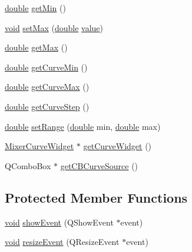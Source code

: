 \begin{DoxyCompactItemize}
\item 
\hyperlink{_super_l_u_support_8h_a8956b2b9f49bf918deed98379d159ca7}{double} \hyperlink{group___config_plugin_ga6d107a62e8f6d1115afbe9869d5fbf62}{get\-Min} ()
\item 
\hyperlink{group___u_a_v_objects_plugin_ga444cf2ff3f0ecbe028adce838d373f5c}{void} \hyperlink{group___config_plugin_ga122781733f46efdca9586ab7d1cb46e3}{set\-Max} (\hyperlink{_super_l_u_support_8h_a8956b2b9f49bf918deed98379d159ca7}{double} \hyperlink{glext_8h_aa0e2e9cea7f208d28acda0480144beb0}{value})
\item 
\hyperlink{_super_l_u_support_8h_a8956b2b9f49bf918deed98379d159ca7}{double} \hyperlink{group___config_plugin_ga218856c51ab9ecff11ecfcf0f6074589}{get\-Max} ()
\item 
\hyperlink{_super_l_u_support_8h_a8956b2b9f49bf918deed98379d159ca7}{double} \hyperlink{group___config_plugin_gae8aad43963c9ca3ce7412e3f8f023e84}{get\-Curve\-Min} ()
\item 
\hyperlink{_super_l_u_support_8h_a8956b2b9f49bf918deed98379d159ca7}{double} \hyperlink{group___config_plugin_ga00f0ef17d7a211c8cfa37feb02cc032c}{get\-Curve\-Max} ()
\item 
\hyperlink{_super_l_u_support_8h_a8956b2b9f49bf918deed98379d159ca7}{double} \hyperlink{group___config_plugin_ga2f4e12f8e1036a490fe9846548bcb197}{get\-Curve\-Step} ()
\item 
\hyperlink{_super_l_u_support_8h_a8956b2b9f49bf918deed98379d159ca7}{double} \hyperlink{group___config_plugin_ga7cd12492effe33f54cbbbc2eed7a5acb}{set\-Range} (\hyperlink{_super_l_u_support_8h_a8956b2b9f49bf918deed98379d159ca7}{double} min, \hyperlink{_super_l_u_support_8h_a8956b2b9f49bf918deed98379d159ca7}{double} max)
\item 
\hyperlink{class_mixer_curve_widget}{Mixer\-Curve\-Widget} $\ast$ \hyperlink{group___config_plugin_ga289025b567020147913c14fbdf51b3d6}{get\-Curve\-Widget} ()
\item 
Q\-Combo\-Box $\ast$ \hyperlink{group___config_plugin_ga8822c0ca3bfdc63eaa942da572b0b8af}{get\-C\-B\-Curve\-Source} ()
\end{DoxyCompactItemize}
\subsection*{Protected Member Functions}
\begin{DoxyCompactItemize}
\item 
\hyperlink{group___u_a_v_objects_plugin_ga444cf2ff3f0ecbe028adce838d373f5c}{void} \hyperlink{group___config_plugin_ga7ccd9c0dd214329e0801e42b6d2858b9}{show\-Event} (Q\-Show\-Event $\ast$event)
\item 
\hyperlink{group___u_a_v_objects_plugin_ga444cf2ff3f0ecbe028adce838d373f5c}{void} \hyperlink{group___config_plugin_gab7f43f88c7142be2694361b898a0bdc0}{resize\-Event} (Q\-Resize\-Event $\ast$event)
\end{DoxyCompactItemize}


